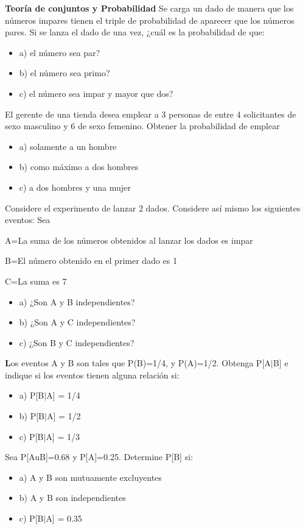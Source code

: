 \documentclass{../oxmathproblems}
\begin{document}
\begin{questions}

\miquestion \textbf{Teoría de conjuntos y Probabilidad} Se carga un dado de manera que los números impares tienen el triple de probabilidad de aparecer que  los números pares. Si se lanza el dado de una vez, ¿cuál es la probabilidad de que: 
\begin{itemize}
\item  a) el número sea par?
\item  b) el número sea primo?
\item  c) el número sea impar y mayor que dos?
\end{itemize}

\miquestion El gerente de una tienda desea emplear a 3 personas de entre 4 solicitantes de sexo masculino y 6 de sexo femenino. Obtener la probabilidad de emplear 
\begin{itemize}
\item  a) solamente a un hombre
\item  b) como máximo a dos hombres
\item  c) a dos hombres y una  mujer
\end{itemize}

\miquestion Considere el experimento de lanzar 2 dados. Considere así mismo los siguientes eventos: Sea 

\text A={La suma de los números obtenidos al lanzar los dados es impar}

\text B={El número obtenido en el primer dado es 1}

\text C={La suma es 7}

\begin{itemize}
 \item a) ¿Son A y B independientes?
\item b) ¿Son A y C independientes?
\item c) ¿Son B y C independientes?
\end{itemize}
\miquestion \textbf Los eventos A y B son tales que P(B)=1/4, y P(A)=1/2. Obtenga P[A$\mid$B] e indique si los eventos tienen alguna relación si: 
\begin{itemize}
 \item a) P[B$\mid$A] = 1/4
 \item b) P[B$\mid$A] = 1/2
 \item  c) P[B$\mid$A] = 1/3
\end{itemize}

\miquestion Sea P[AuB]=0.68 y P[A]=0.25. Determine P[B] si:
\begin{itemize}
 \item a) A y B son mutuamente excluyentes 
 \item b) A y B son independientes
 \item  c) P[B$\mid$A] = 0.35 
\end{itemize}


\end{questions}
\end{document}
